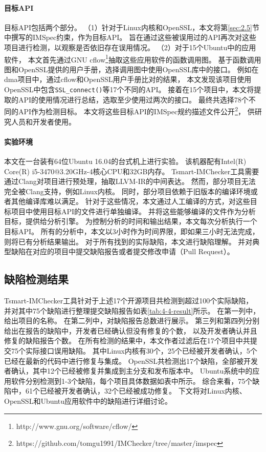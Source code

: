 \paragraph{目标API}
目标API包括两个部分。
（1）针对于Linux内核和OpenSSL，本文将第\ref{sec:2.5}节中撰写的IMSpec约束，作为目标API。
旨在通过这些被误用过的API再次对这些项目进行检测，以观察是否依旧存在误用情况。
（2）对于15个Ubuntu中的应用软件，
本文首先通过GNU cflow\footnote{http://www.gnu.org/software/cflow/}抽取这些应用软件的函数调用图。
基于函数调用图和OpenSSL提供的用户手册，选择调用图中使用OpenSSL库中的接口。
例如在dma项目中，通过cflow和OpenSSL用户手册比对的结果，
本文发现该项目使用OpenSSL中包含\texttt{SSL\_connect()}等17个不同的API。
接着在15个项目中，本文将提取的API的使用情况进行总结，选取至少使用过两次的接口。
最终共选择78个不同的API作为检测目标。
本文将这些目标API的IMSpec规约描述文件公开\footnote{https://github.com/tomgu1991/IMChecker/tree/master/imspec}，
供研究人员和开发者使用。

\paragraph{实验环境}
本文在一台装有64位Ubuntu 16.04的台式机上进行实验。
该机器配有Intel(R) Core(R) i5-3470@3.20GHz-4核心CPU和32GB内存。
Tsmart-IMChecker工具需要通过Clang对项目进行预处理，抽取LLVM-IR的中间表达。
然而，部分项目无法完全被Clang支持，例如Linux内核。
同时，部分项目依赖于旧版本的编译环境或者其他编译库难以满足。
针对于这些情况，本文通过人工编译的方式，对这些目标项目中使用目标API的文件进行单独编译。
并将这些能够编译的文件作为分析目标，提供给分析引擎。
为控制分析的时间和输出结果，本文每次分析执行一个目标API。
所有的分析中，本文以3小时作为时间界限，即如果三小时无法完成，则将已有分析结果输出。
对于所有找到的实际缺陷，本文进行缺陷理解。
并对典型缺陷在对应的项目中提交缺陷报告或者提交修改申请（Pull Request）。

\subsection{缺陷检测结果}

Tsmart-IMChecker工具针对于上述17个开源项目共检测到超过100个实际缺陷，
并对其中75个缺陷进行整理提交缺陷报告如表\ref{tab:4-4-result}所示。
在第一列中，给出项目的名称。
在第二列中，对缺陷报告总数进行展示。
第三列和第四列分别给出在报告的缺陷中，开发者已经确认但没有修复的个数，
以及开发者确认并且修复的缺陷报告个数。
在所有检测的结果中，本文作者过滤后在17个项目中共提交75个实际接口误用缺陷。
其中Linux内核有30个，25个已经被开发者确认，5个已经在最新的代码中进行修复与集成。
OpenSSL共检测出17个缺陷，全部被开发者确认，其中12个已经被修复并集成到主分支和发布版本中。
Ubuntu系统中的应用软件分别检测到1-3个缺陷，每个项目具体数据如表中所示。
综合来看，75个缺陷中，61个已经被开发者确认，32个已经被成功修复。
下文将对Linux内核、OpenSSL和Ubuntu应用软件中的缺陷进行详细讨论。

